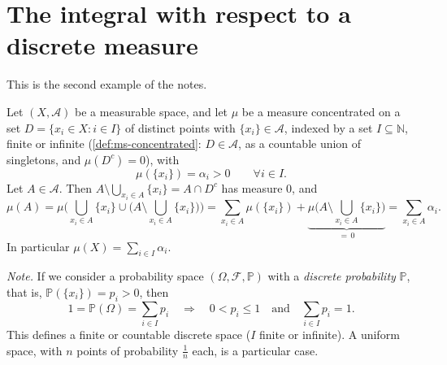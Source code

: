 
\section{The integral with respect to a discrete measure}\label{sec:ig-discrete}

This is the second example of the notes.

\begin{example}\label{exa:ig-discrete-measure}
Let $(X,\mathcal A)$ be a measurable space, and let $\mu$ be a measure concentrated on a set
$D=\{x_i\in X:i\in I\}$ of distinct points with $\{x_i\}\in\mathcal A$, indexed by a set
$I\subseteq\mathbb N$, finite or infinite
(\cref{def:ms-concentrated}: $D\in\mathcal A$, as a countable union of singletons, and
$\mu(D^c)=0$), with
\[
  \mu(\{x_i\})=\alpha_i>0\qquad\forall i\in I .
\]
Let $A\in\mathcal A$. Then $A\setminus\bigcup_{x_i\in A}\{x_i\}=A\cap D^c$ has measure $0$, and
\[
  \mu(A)=\mu\Big(\bigcup_{x_i\in A}\{x_i\}\cup\Big(A\setminus\bigcup_{x_i\in A}\{x_i\}\Big)\Big)
  =\sum_{x_i\in A}\mu(\{x_i\})+\underbrace{\mu\Big(A\setminus\bigcup_{x_i\in A}\{x_i\}\Big)}_{=\,0}
  =\sum_{x_i\in A}\alpha_i .
\]
In particular $\mu(X)=\sum_{i\in I}\alpha_i$.

\emph{Note.} If we consider a probability space $(\Omega,\mathcal F,\mathbb P)$ with a
\emph{discrete probability} $\mathbb P$, that is, $\mathbb P(\{x_i\})=p_i>0$, then
\[
  1=\mathbb P(\Omega)=\sum_{i\in I}p_i\quad\Longrightarrow\quad 0<p_i\le1\quad\text{and}\quad
  \sum_{i\in I}p_i=1 .
\]
This defines a finite or countable discrete space ($I$ finite or infinite). A uniform space, with $n$ points of probability $\frac1n$ each, is a particular
case.


\end{example}
